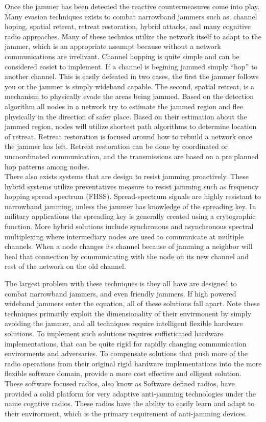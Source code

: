 Once the jammer has been detected the reactive countermeasures come into play.  Many evasion techniques exists to combat narrowband jammers such as: channel hoping, spatial retreat, retreat restoration, hybrid attacks, and many cognitive radio approaches\cite{2}.  Many of these technics utilize the network itself to adapt to the jammer, which is an appropriate assumpt because without a network communications are irrelivant.  Channel hopping is quite simple and can be considered easiet to implement.  If a channel is begining jammed simply ``hop'' to another channel.  This is easily defeated in two cases, the first the jammer follows you or the jammer is simply wideband capable.  The second, spatial retreat, is a mechanism to physically evade the areas being jammed. Based on the detection algorithm all nodes in a network try to estimate the jammed region and flee physically in the direction of safer place. Based on their estimation about the jammed region, nodes will utilize shortest path algorithms to determine location of retreat\cite{5}.  Retreat restoration is focused around how to rebuild a network once the jammer has left.  Retreat restoration can be done by coordinated or uncoordinated communication, and the transmissions are based on a pre planned hop patterns among nodes\cite{6}.\\

There also exists systems that are design to resist jamming proactively.  These hybrid systems\cite{7} utilize preventatives measure to resist jamming such as frequency hopping spread spectrum (FHSS).  Spread-spectrum signals are highly resistant to narrowband jamming, unless the jammer has knowledge of the spreading key. In military applications the spreading key is generally created using a crytographic function\cite{sterling}.  More hybrid solutions include synchronous and asynchronous spectral multiplexing where intermediary nodes are used to communicate at multiple channels.  When a node changes its channel because of jamming a neighbor will heal that connection by communicating  with the node on its new channel and rest of the network on the old channel\cite{8}.


The largest problem with these techniques is they all have are designed to combat narrowband jammers, and even friendly jammers.  If high powered wideband jammers enter the equation, all of these solutions fall apart.  Note these techniques primarily exploit the dimensionality of their envirmonent by simply avoiding the jammer, and all techniques require intelligent flexible hardware solutions.   To implement such solutions requires suffisticated hardware implementations, that can be quite rigid for rapidly changing communication envirorments and adversaries.  To compensate solutions that push more of the radio operations from their original rigid hardware implementations into the more flexible software domain, provide a more cost effective and elligent solution.  These software focused radios, also know as Software defined radios, have provided a solid platform for very adaptive anti-jamming technologies under the name cogntive radios.  These radios have the ability to easily learn and adapt to their envirorment, which is the primary requirement of anti-jamming devices.\\

